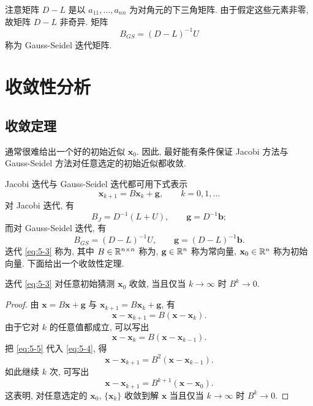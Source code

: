 注意矩阵 $D-L$ 是以 $a_{11},\ldots,a_{nn}$ 为对角元的下三角矩阵. 由于假定这些元素非零, 故矩阵 $D-L$ 非奇异. 矩阵
\[
  B_{GS}=(D-L)^{-1}U
\]
称为 Gauss-Seidel 迭代矩阵.

\section{收敛性分析}
\label{sec:5-2}

\subsection{收敛定理}
\label{subsec:5-2-1}

通常很难给出一个好的初始近似 $\mathbf{x}_0$. 因此, 最好能有条件保证 Jacobi 方法与 Gauss-Seidel 方法对任意选定的初始近似都收敛.

Jacobi 迭代与 Gauss-Seidel 迭代都可用下式表示
\begin{equation}
  \mathbf{x}_{k+1}=B\mathbf{x}_k+\mathbf{g},\qquad k=0,1,\ldots
  \label{eq:5-3}
\end{equation}
对 Jacobi 迭代, 有
\[
  B_J=D^{-1}(L+U),\qquad \mathbf{g}=D^{-1}\mathbf{b};
\]
而对 Gauss-Seidel 迭代, 有
\[
  B_{GS}=(D-L)^{-1}U,\qquad \mathbf{g}=(D-L)^{-1}\mathbf{b}.
\]
迭代 \eqref{eq:5-3} 称为, 其中 $B\in\mathbb{R}^{n\times n}$ 称为, $\mathbf{g}\in\mathbb{R}^n$ 称为常向量, $\mathbf{x}_0\in\mathbb{R}^n$ 称为初始向量. 下面给出一个收敛性定理.

\begin{theorem}
\label{thm:5-1}
迭代 \eqref{eq:5-3} 对任意初始猜测 $\mathbf{x}_0$ 收敛, 当且仅当 $k\to\infty$ 时 $B^k\to0$.
\end{theorem}

\begin{proof}
由 $\mathbf{x}=B\mathbf{x}+\mathbf{g}$ 与 $\mathbf{x}_{k+1}=B\mathbf{x}_k+\mathbf{g}$, 有
\begin{equation}
  \mathbf{x}-\mathbf{x}_{k+1}=B(\mathbf{x}-\mathbf{x}_k).
  \label{eq:5-4}
\end{equation}
由于它对 $k$ 的任意值都成立, 可以写出
\begin{equation}
  \mathbf{x}-\mathbf{x}_k=B(\mathbf{x}-\mathbf{x}_{k-1}).
  \label{eq:5-5}
\end{equation}
把 \eqref{eq:5-5} 代入 \eqref{eq:5-4}, 得
\[
  \mathbf{x}-\mathbf{x}_{k+1}=B^2(\mathbf{x}-\mathbf{x}_{k-1}).
\]
如此继续 $k$ 次, 可写出
\[
  \mathbf{x}-\mathbf{x}_{k+1}=B^{k+1}(\mathbf{x}-\mathbf{x}_0).
\]
这表明, 对任意选定的 $\mathbf{x}_0$, $\{\mathbf{x}_k\}$ 收敛到解 $\mathbf{x}$ 当且仅当 $k\to\infty$ 时 $B^k\to0$.
\end{proof}

